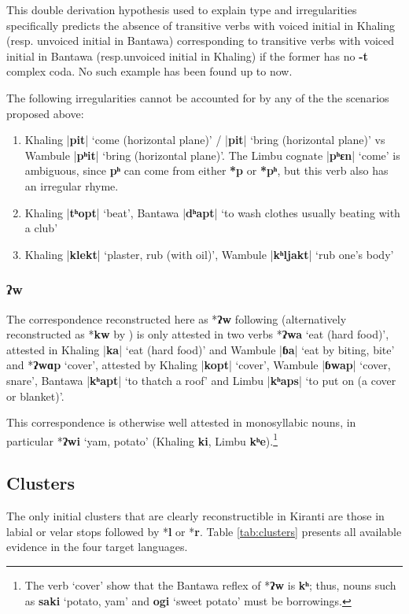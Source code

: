 \documentclass[oldfontcommands,oneside,a4paper,11pt]{article}
\newcommand{\ipa}[1]{\textbf{{\phon\mbox{#1}}}} %
\newcommand{\dhatu}[2]{|\ipa{#1}| `#2'}
\begin{document}
 This double derivation hypothesis used to explain type  and irregularities specifically predicts the absence of transitive verbs with voiced initial in Khaling (resp. unvoiced initial in Bantawa) corresponding to transitive verbs with voiced initial in Bantawa (resp.unvoiced initial in Khaling) if the former has no \ipa{-t} complex coda. No such example has been found up to now.
 
The following irregularities cannot be accounted for by any of the the scenarios proposed above:

\begin{enumerate}
\item  Khaling \dhatu{pit}{come (horizontal plane)} / \dhatu{pit}{bring (horizontal plane)} vs Wambule \dhatu{pʰit}{bring (horizontal plane)}. The Limbu cognate \dhatu{pʰɛn}{come}	is ambiguous, since \ipa{pʰ} can come from either \ipa{*p} or \ipa{*pʰ}, but this verb also has an irregular rhyme. 
\item Khaling  \dhatu{tʰopt}{beat}, Bantawa \dhatu{dʰapt}{to wash clothes usually beating with a club}
\item Khaling  \dhatu{klekt}{plaster, rub (with oil)}, Wambule \dhatu{kʰljakt}{rub one's body}
 \end{enumerate}

\subsubsection{\ipa{ʔw}}
The correspondence reconstructed here as *\ipa{ʔw} following \citet{michailovsky94stops} (alternatively reconstructed as *\ipa{kw} by \citet{opgenort04implosives}) is only attested in two verbs *\ipa{ʔwa} `eat (hard food)', attested in Khaling \dhatu{ka}{eat (hard food)} and Wambule \dhatu{ɓa}{eat by biting, bite} and  *\ipa{ʔwɑp} `cover', attested by  Khaling \dhatu{kopt}{cover}, Wambule \dhatu{ɓwap}{cover, snare}, Bantawa \dhatu{kʰapt}{to thatch a roof} and Limbu  \dhatu{kʰaps}{to put on (a cover or blanket)}. 
 
 This correspondence is otherwise well attested in monosyllabic nouns, in particular *\ipa{ʔwi} `yam, potato' (Khaling \ipa{ki}, Limbu \ipa{kʰe}).\footnote{The verb `cover' show that the Bantawa reflex of *\ipa{ʔw} is \ipa{kʰ}; thus, nouns such as \ipa{saki} `potato, yam' and \ipa{ogi} `sweet potato' must be borrowings.}


\subsection{Clusters} \label{sec:clusters}
The only initial clusters that are clearly reconstructible in Kiranti are those in labial or velar stops followed by *\ipa{l} or *\ipa{r}. Table \ref{tab:clusters} presents all available evidence in the four target languages.
\end{document}

